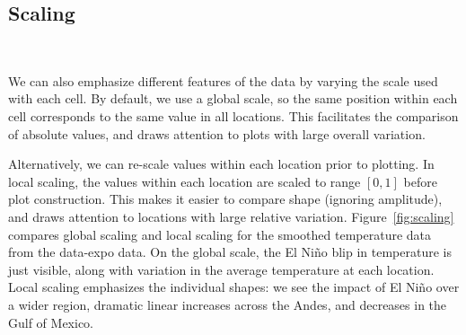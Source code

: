 \documentclass[oneside]{article}
\begin{document}




\subsection{Scaling}~\label{sec:scale}


We can also emphasize different features of the data by varying the scale used with each cell. By default, we use a global scale, so the same position within each cell corresponds to the same value in all locations. This facilitates the comparison of absolute values, and draws attention to plots with large overall variation.

Alternatively, we can re-scale values within each location prior to plotting. In local scaling, the values within each location are scaled to range $[0, 1]$ before plot construction. This makes it easier to compare shape (ignoring amplitude), and draws attention to locations with large relative variation. Figure~\ref{fig:scaling} compares global scaling and local scaling for the smoothed temperature data from the data-expo data. On the global scale, the El Ni\~no blip in temperature is just visible, along with variation in the average temperature at each location. Local scaling emphasizes the individual shapes: we see the impact of El Ni\~no over a wider region, dramatic linear increases across the Andes, and decreases in the Gulf of Mexico.
\end{document}
